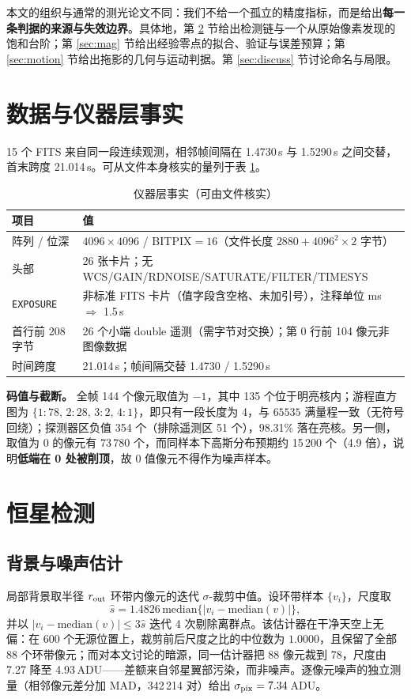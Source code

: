 \documentclass[11pt,a4paper]{ctexart}
\begin{document}
本文的组织与通常的测光论文不同：我们不给一个孤立的精度指标，而是给出\textbf{每一条判据的来源与失效边界}。具体地，第 \ref{sec:detect} 节给出检测链与一个从原始像素发现的饱和台阶；第 \ref{sec:mag} 节给出经验零点的拟合、验证与误差预算；第 \ref{sec:motion} 节给出拖影的几何与运动判据。第 \ref{sec:discuss} 节讨论命名与局限。

\section{数据与仪器层事实}\label{sec:data}
15 个 FITS 来自同一段连续观测，相邻帧间隔在 1.4730\,s 与 1.5290\,s 之间交替，首末跨度 21.014\,s。可从文件本身核实的量列于表 \ref{tab:inst}。

\begin{table}[htbp]\centering\small
\caption{仪器层事实（可由文件核实）}\label{tab:inst}
\begin{tabular}{@{}ll@{}}
\toprule
项目 & 值\\
\midrule
阵列 / 位深 & $4096\times4096$ / BITPIX$=16$（文件长度 $2880+4096^2\!\times\!2$ 字节）\\
头部 & 26 张卡片；无 WCS/GAIN/RDNOISE/SATURATE/FILTER/TIMESYS\\
\texttt{EXPOSURE} & 非标准 FITS 卡片（值字段含空格、未加引号），注释单位 ms $\Rightarrow$ 1.5\,s\\
首行前 208 字节 & 26 个小端 double 遥测（需字节对交换）；第 0 行前 104 像元非图像数据\\
时间跨度 & 21.014\,s；帧间隔交替 1.4730 / 1.5290\,s\\
\bottomrule
\end{tabular}
\end{table}

\noindent\textbf{码值与截断。} 全帧 144 个像元取值为 $-1$，其中 135 个位于明亮核内；游程直方图为 $\{1{:}78,\,2{:}28,\,3{:}2,\,4{:}1\}$，即只有一段长度为 4，与 $65535$ 满量程一致（无符号回绕）；探测器区负值 354 个（排除遥测区 51 个），98.31\% 落在亮核。另一侧，取值为 $0$ 的像元有 73\,780 个，而同样本下高斯分布预期约 15\,200 个（4.9 倍），说明\textbf{低端在 0 处被削顶}，故 $0$ 值像元不得作为噪声样本。

\section{恒星检测}\label{sec:detect}
\subsection{背景与噪声估计}
局部背景取半径 $r_{\rm out}$ 环带内像元的迭代 $\sigma$-裁剪中值。设环带样本 $\{v_i\}$，尺度取
\begin{equation}
\hat s = 1.4826\,\mathrm{median}\{|v_i-\mathrm{median}(v)|\},
\end{equation}
并以 $|v_i-\mathrm{median}(v)|\le 3\hat s$ 迭代 4 次剔除离群点。该估计器在干净天空上无偏：在 600 个无源位置上，裁剪前后尺度之比的中位数为 $1.0000$，且保留了全部 88 个环带像元；而对本文讨论的暗源，同一估计器把 88 像元裁到 78，尺度由 7.27 降至 4.93\,ADU——差额来自邻星翼部污染，而非噪声。逐像元噪声的独立测量（相邻像元差分加 MAD，342\,214 对）给出 $\sigma_{\rm pix}=7.34$\,ADU。
\end{document}
